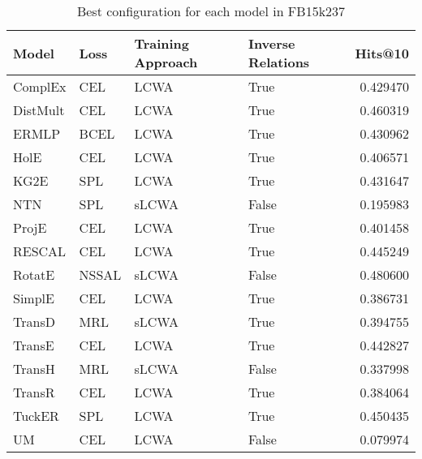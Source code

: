 \begin{table}
\centering
\caption{Best configuration for each model in FB15k237}
\label{best_models_fb15k237}
\begin{tabular}{llllr}
\toprule
    Model &   Loss & Training Approach & Inverse Relations &   Hits@10 \\
\midrule
  ComplEx &    CEL &              LCWA &              True &  0.429470 \\
 DistMult &    CEL &              LCWA &              True &  0.460319 \\
    ERMLP &   BCEL &              LCWA &              True &  0.430962 \\
     HolE &    CEL &              LCWA &              True &  0.406571 \\
     KG2E &    SPL &              LCWA &              True &  0.431647 \\
      NTN &    SPL &             sLCWA &             False &  0.195983 \\
    ProjE &    CEL &              LCWA &              True &  0.401458 \\
   RESCAL &    CEL &              LCWA &              True &  0.445249 \\
   RotatE &  NSSAL &             sLCWA &             False &  0.480600 \\
   SimplE &    CEL &              LCWA &              True &  0.386731 \\
   TransD &    MRL &             sLCWA &              True &  0.394755 \\
   TransE &    CEL &              LCWA &              True &  0.442827 \\
   TransH &    MRL &             sLCWA &             False &  0.337998 \\
   TransR &    CEL &              LCWA &              True &  0.384064 \\
   TuckER &    SPL &              LCWA &              True &  0.450435 \\
       UM &    CEL &              LCWA &             False &  0.079974 \\
\bottomrule
\end{tabular}
\end{table}

